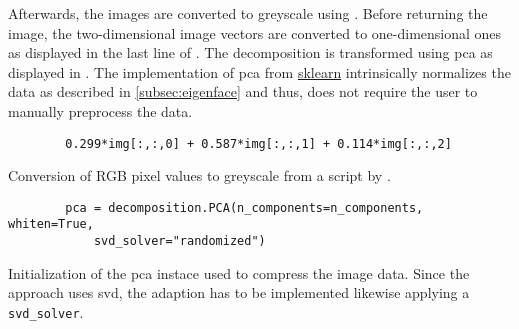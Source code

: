 Afterwards, the images are converted to greyscale using .
Before returning the image, the two-dimensional image vectors are converted to one-dimensional ones as displayed in the last line of .
The decomposition is transformed using \ac{pca} as displayed in .
The implementation of \ac{pca} from \href{https://scikit-learn.org/stable/modules/generated/sklearn.decomposition.PCA.html}{sklearn} 
intrinsically normalizes the data as described in \autoref{subsec:eigenface} and thus, does not require the user to manually preprocess the data.


\begin{listing}[htp]
    \begin{verbatim}
        0.299*img[:,:,0] + 0.587*img[:,:,1] + 0.114*img[:,:,2]
    \end{verbatim}
    \caption[Conversion of RGB pixel values to greyscale]{Conversion of RGB pixel values to greyscale from a script by \thesissupervisor{}.}
    \label{lst:rgb2grey}
\end{listing}

\begin{listing}[htp]
    \begin{verbatim}
        pca = decomposition.PCA(n_components=n_components, whiten=True, 
            svd_solver="randomized")
    \end{verbatim}
    \caption[Initialization of the \ac{pca} instace]{Initialization of the \ac{pca} instace used to compress the image data.
    Since the \eigenfaces{} approach uses \ac{svd}, the adaption \eigendocs{} has to be implemented likewise applying a \texttt{svd\_solver}.
    }
    \label{lst:pca_svd}
\end{listing}


